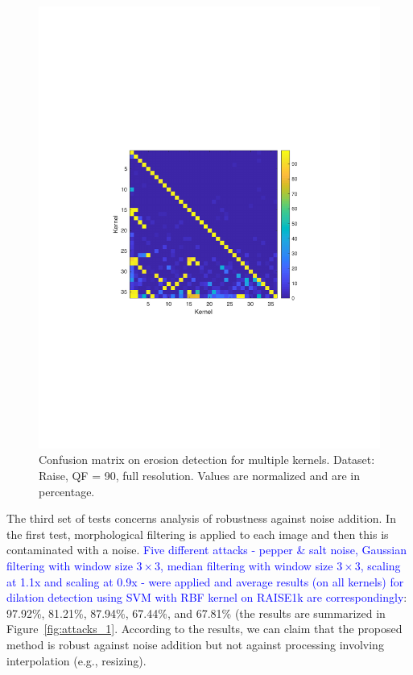 \documentclass{ieeeaccess}
\begin{document}
\begin{figure}[b!]
	\centering
	\includegraphics[width=\linewidth]{confusion_matrix}
	\caption{Confusion matrix on erosion detection for multiple kernels. Dataset: Raise, QF = 90, full resolution. Values are normalized and are in percentage.}
	\label{fig:confusion}
\end{figure}

The third set of tests concerns analysis of robustness against noise addition. In the first test, morphological filtering is applied to each image and then this is contaminated with a noise. \textcolor{blue}{Five different attacks - pepper \& salt noise, Gaussian filtering with window size $3 \times 3$, median filtering with window size $3 \times 3$, scaling at 1.1x and scaling at 0.9x - were applied and average results (on all kernels) for dilation detection using SVM with RBF kernel on RAISE1k are correspondingly}: 97.92\%, 81.21\%, 87.94\%, 67.44\%, and 67.81\% (the results are summarized in Figure~\ref{fig:attacks_1}. According to the results, we can claim that the proposed method is robust against noise addition but not against processing involving interpolation (e.g., resizing). 
\end{document}
